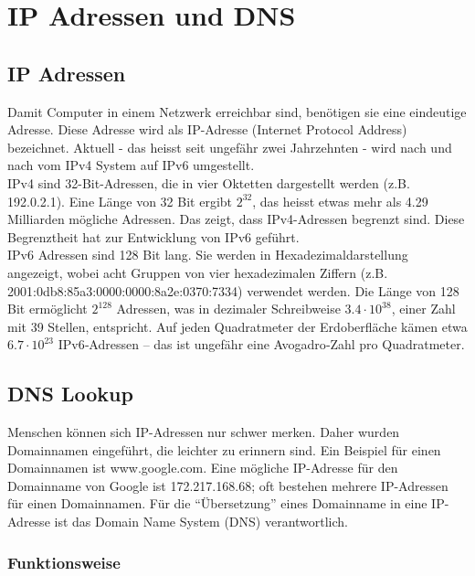 \documentclass[
  nswissgerman,
  a4paper,
  DIV=11,
  numbers=noendperiod,
  ngerman]{scrreprt}
\begin{document}
\chapter{IP Adressen und DNS}\label{ip-adressen-und-dns}

\section{IP Adressen}\label{ip-adressen}

Damit Computer in einem Netzwerk erreichbar sind, benötigen sie eine
eindeutige Adresse. Diese Adresse wird als IP-Adresse (Internet Protocol
Address) bezeichnet. Aktuell - das heisst seit ungefähr zwei Jahrzehnten
- wird nach und nach vom IPv4 System auf IPv6 umgestellt.\\
IPv4 sind 32-Bit-Adressen, die in vier Oktetten dargestellt werden (z.B.
192.0.2.1). Eine Länge von 32 Bit ergibt \(2^{32}\), das heisst etwas
mehr als 4.29 Milliarden mögliche Adressen. Das zeigt, dass
IPv4-Adressen begrenzt sind. Diese Begrenztheit hat zur Entwicklung von
IPv6 geführt.\\
IPv6 Adressen sind 128 Bit lang. Sie werden in Hexadezimaldarstellung
angezeigt, wobei acht Gruppen von vier hexadezimalen Ziffern (z.B.
2001:0db8:85a3:0000:0000:8a2e:0370:7334) verwendet werden. Die Länge von
128 Bit ermöglicht \(2^{128}\) Adressen, was in dezimaler Schreibweise
\(3.4
\cdot 10^{38}\), einer Zahl mit 39 Stellen, entspricht. Auf jeden
Quadratmeter der Erdoberfläche kämen etwa \(6.7 \cdot 10^{23}\)
IPv6‑Adressen -- das ist ungefähr eine Avogadro‑Zahl pro Quadratmeter.

\section{DNS Lookup}\label{dns-lookup}

Menschen können sich IP-Adressen nur schwer merken. Daher wurden
Domainnamen eingeführt, die leichter zu erinnern sind. Ein Beispiel für
einen Domainnamen ist www.google.com. Eine mögliche IP-Adresse für den
Domainname von Google ist 172.217.168.68; oft bestehen mehrere
IP-Adressen für einen Domainnamen. Für die ``Übersetzung'' eines
Domainname in eine IP-Adresse ist das Domain Name System (DNS)
verantwortlich.

\subsection{Funktionsweise}\label{funktionsweise}
\end{document}
